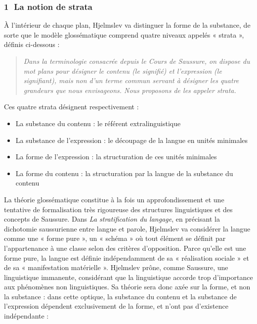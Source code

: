 \subsubsection*{\textcircled{\scriptsize 1} La notion de strata}
À l’intérieur de chaque plan, Hjelmslev va distinguer la forme de la substance, de sorte que le modèle glossématique comprend quatre niveaux appelés « strata », définis ci-dessous :
\begin{quote}\small\itshape
Dans la terminologie consacrée depuis le Cours de Saussure, on dispose du mot plans pour désigner le contenu (le signifié) et l’expression (le signifiant), mais non d’un terme commun servant à désigner les quatre grandeurs que nous envisageons. Nous proposons de les appeler strata.
\end{quote}
Ces quatre strata désignent respectivement :
\begin{itemize}
\item La substance du contenu : le référent extralinguistique
\item La substance de l’expression : le découpage de la langue en unités minimales
\item La forme de l’expression : la structuration de ces unités minimales
\item La forme du contenu : la structuration par la langue de la substance du contenu
\end{itemize}
La théorie glossématique constitue à la fois un approfondissement et une tentative de formalisation très rigoureuse des structures linguistiques et des concepts de Saussure. Dans \textit{La stratification du langage}, en précisant la dichotomie saussurienne entre langue et parole, Hjelmslev va considérer la langue comme une « forme pure », un « schéma » où tout élément se définit par l’appartenance à une classe selon des critères d’opposition. Parce qu’elle est une forme pure, la langue est définie indépendamment de sa « réalisation sociale » et de sa « manifestation matérielle ». Hjelmslev prône, comme Saussure, une linguistique immanente, considérant que la linguistique accorde trop d’importance aux phénomènes non linguistiques. Sa théorie sera donc axée sur la forme, et non la substance : dans cette optique, la substance du contenu et la substance de l’expression dépendent exclusivement de la forme, et n’ont pas d’existence indépendante :
